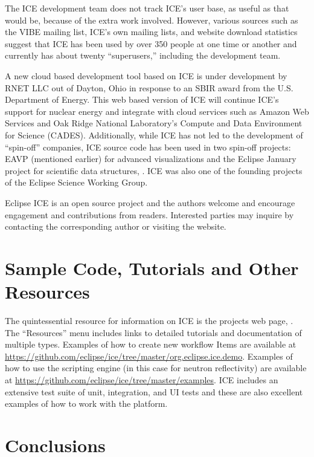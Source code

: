 The ICE development team does not track ICE's user base, as useful as
that would be, because of the extra work involved. However, various
sources such as the VIBE mailing list, ICE's own mailing lists, and
website download statistics suggest that ICE has been used by over 350
people at one time or another and currently has about twenty
``superusers,'' including the development team.

A new cloud based development tool based on ICE is under development by
RNET LLC out of Dayton, Ohio in response to an SBIR award from the U.S.
Department of Energy. This web based version of ICE will continue ICE's
support for nuclear energy and integrate with cloud services such as
Amazon Web Services and Oak Ridge National Laboratory's Compute and Data
Environment for Science (CADES). Additionally, while ICE has not led to
the development of ``spin-off'' companies, ICE source code has been used
in two spin-off projects: EAVP (mentioned earlier) for advanced
visualizations and the Eclipse January project for scientific data
structures, \cite{graham_eclipse_2016}. ICE was also one of the founding
projects of the Eclipse Science Working Group.

Eclipse ICE is an open source project and the authors welcome and encourage
engagement and contributions from readers. Interested parties may inquire by
contacting the corresponding author or visiting the website.

\section{Sample Code, Tutorials and Other
Resources}\label{sample-code-tutorials-and-other-resources}

The quintessential resource for information on ICE is the projects web
page, \cite{billings_eclipse_2016}. The ``Resources'' menu includes links to
detailed tutorials and documentation of multiple types. Examples of how to create
new workflow Items are available at
\url{https://github.com/eclipse/ice/tree/master/org.eclipse.ice.demo}.
Examples of how to use the scripting engine (in this case for neutron
reflectivity) are available at
\url{https://github.com/eclipse/ice/tree/master/examples}. ICE includes an
extensive test suite of unit, integration, and UI tests and these are
also excellent examples of how to work with the platform.

\section{Conclusions}\label{conclusions}

